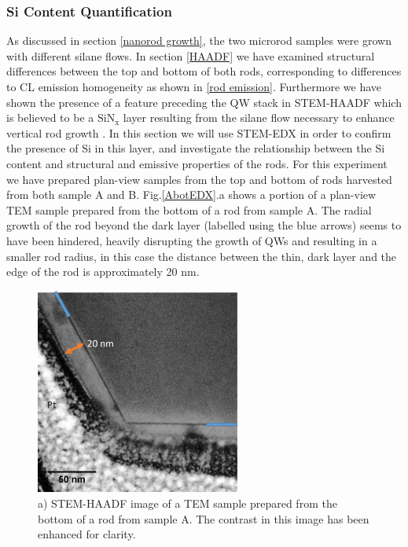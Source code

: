 \subsubsection{Si Content Quantification}
As discussed in section \ref{nanorod growth}, the two microrod samples were grown with different silane flows. In section \ref{HAADF} we have examined structural differences between the top and bottom of both rods, corresponding to differences to CL emission homogeneity as shown in \ref{rod emission}. Furthermore we have shown the presence of a feature preceding the QW stack in STEM-HAADF which is believed to be a $\mathrm{SiN_{x}}$ layer resulting from the silane flow necessary to enhance vertical rod growth \cite{Tessarek2014a}. In this section we will use STEM-EDX in order to confirm the presence of Si in this layer, and investigate the relationship between the Si content and structural and emissive properties of the rods. For this experiment we have prepared plan-view samples from the top and bottom of rods harvested from both sample A and B.
Fig.\ref{AbotEDX}.a shows a portion of a plan-view TEM sample prepared from the bottom of a rod from sample A. The radial growth of the rod beyond the dark layer (labelled using the blue arrows) seems to have been hindered, heavily disrupting the growth of QWs and resulting in a smaller rod radius, in this case the distance between the thin, dark layer and the edge of the rod is approximately 20 nm.

\begin{figure}[h]
	\centering
	\includegraphics[width=0.6\textwidth]{Figs/Ch6/abotdf}
	\caption{a) STEM-HAADF image of a TEM sample prepared from the bottom of a rod from sample A. The contrast in this image has been enhanced for clarity.}
	\label{AbotDF}
\end{figure}
\FloatBarrier


